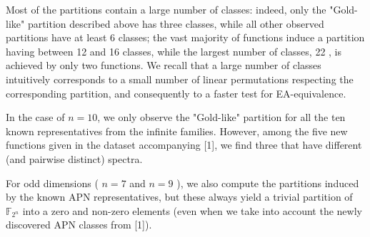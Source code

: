\documentclass[10pt]{article}
\begin{document}
Most of the partitions contain a large number of classes: indeed, only the "Gold-like" partition described above has three classes, while all other observed partitions have at least 6 classes; the vast majority of functions induce a partition having between 12 and 16 classes, while the largest number of classes, 22 , is achieved by only two functions. We recall that a large number of classes intuitively corresponds to a small number of linear permutations respecting the corresponding partition, and consequently to a faster test for EA-equivalence.

In the case of $n=10$, we only observe the "Gold-like" partition for all the ten known representatives from the infinite families. However, among the five new functions given in the dataset accompanying [1], we find three that have different (and pairwise distinct) spectra.

For odd dimensions ( $n=7$ and $n=9$ ), we also compute the partitions induced by the known APN representatives, but these always yield a trivial partition of $\mathbb{F}_{2^{n}}$ into a zero and non-zero elements (even when we take into account the newly discovered APN classes from [1]).
\end{document}
